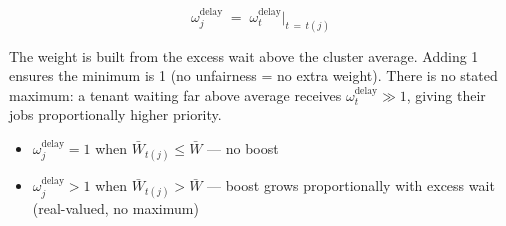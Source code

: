 \documentclass[11pt]{article}
\newcommand{\omdelay}{\omega_j^{\text{delay}}}
\newcommand{\omdelayt}{\omega_t^{\text{delay}}}
\begin{document}
\[
  \omdelay \;=\; \omdelayt\big|_{t\,=\,t(j)}
\]

The weight is built from the excess wait above the cluster average. Adding 1
ensures the minimum is 1 (no unfairness = no extra weight). There is no stated
maximum: a tenant waiting far above average receives $\omdelayt \gg 1$, giving
their jobs proportionally higher priority.

\begin{itemize}[noitemsep, topsep=4pt]
  \item $\omdelay = 1$ when $\bar{W}_{t(j)} \leq \bar{W}$ --- no boost
  \item $\omdelay > 1$ when $\bar{W}_{t(j)} > \bar{W}$ --- boost grows
    proportionally with excess wait (real-valued, no maximum)
\end{itemize}
\end{document}
